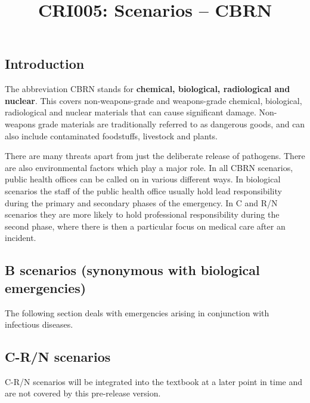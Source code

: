 \documentclass{article}
\begin{document}
\title{CRI005: Scenarios – CBRN}

\maketitle


\subsection{Introduction}\label{H2656935}



The abbreviation CBRN stands for \textbf{chemical, biological, radiological and nuclear}. This covers non-weapons-grade and weapons-grade chemical, biological, radiological and nuclear materials that can cause significant damage. Non-weapons grade materials are traditionally referred to as dangerous goods, and can also include contaminated foodstuffs, livestock and plants.


There are many threats apart from just the deliberate release of pathogens. There are also environmental factors which play a major role. In all CBRN scenarios, public health offices can be called on in various different ways. In biological scenarios the staff of the public health office usually hold lead responsibility during the primary and secondary phases of the emergency. In C and R/N scenarios they are more likely to hold professional responsibility during the second phase, where there is then a particular focus on medical care after an incident.


\subsection{B scenarios (synonymous with biological emergencies)}\label{H411227}



The following section deals with emergencies arising in conjunction with infectious diseases.


\subsection{C-R/N scenarios}\label{H5103505}



C-R/N scenarios will be integrated into the textbook at a later point in time and are not covered by this pre-release version.
\end{document}
